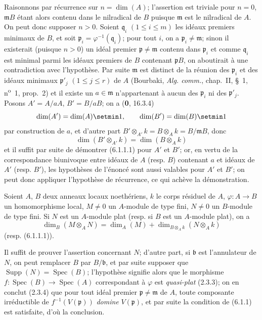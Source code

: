 Raisonnons par récurrence sur $n=\dim(A)$; l'assertion est triviale pour
$n=0$, $\mathfrak mB$ étant alors contenu dans le nilradical de $B$ puisque
$\mathfrak m$ est le nilradical de $A$. On peut donc supposer $n>0$. Soient
$\mathfrak q_i$ $(1\leq i\leq m)$ les idéaux premiers minimaux de $B$, et soit
$\mathfrak p_i=\varphi^{-1}(\mathfrak q_i)$; pour tout $i$, on a
$\mathfrak p_i\neq\mathfrak m$; sinon il existerait (puisque $n>0$) un idéal
premier $\mathfrak p\neq\mathfrak m$ contenu dans $\mathfrak p_i$ et comme
$\mathfrak q_i$ est minimal parmi les idéaux premiers de $B$ contenant
$\mathfrak pB$, on aboutirait à une contradiction avec l'hypothèse. Par suite
$\mathfrak m$ est distinct de la réunion des $\mathfrak p_i$ et des idéaux
minimaux $\mathfrak p'_j$ $(1\leq j\leq r)$ de $A$ (Bourbaki,
\emph{Alg. comm.}, chap.~II, §~1, n\textsuperscript{o}~1, prop.~2) et il
existe un $a\in\mathfrak m$ n'appartenant à aucun des $\mathfrak p_i$ ni des
$\mathfrak p'_j$. Posons $A'=A/aA$, $B'=B/aB$; on a (\textbf{0}, 16.3.4)
\[
\dim(A')=\dim(A)\setmin 1,\qquad \dim(B')=\dim(B)\setmin 1
\]
par construction de $a$, et d'autre part
$B'\otimes_{A'}k=B\otimes_Ak=B/\mathfrak mB$, donc
\[
\dim(B'\otimes_{A'}k)=\dim(B\otimes_Ak)
\]
et il suffit par suite de démontrer (6.1.1.1) pour $A'$ et $B'$; or, en vertu
de la correspondance biunivoque entre idéaux de $A$ (resp. $B$) contenant $a$
et idéaux de $A'$ (resp. $B'$), les hypothèses de l'énoncé sont aussi
valables pour $A'$ et $B'$; on peut donc appliquer l'hypothèse de récurrence,
ce qui achève la démonstration.

\begin{corollary}[6.1.2]
\label{IV.2.s6.1.2-fr}
Soient $A$, $B$ deux anneaux locaux noethériens, $k$ le corps résiduel de
$A$, $\varphi:A\to B$ un homomorphisme local, $M\neq0$ un $A$-module de type
fini, $N\neq0$ un $B$-module de type fini. Si $N$ est un $A$-module plat
\textup{(resp.} si $B$ est un $A$-module plat), on a
\begin{equation}
\dim_B(M\otimes_A N)=\dim_A(M)+
\dim_{B\otimes_Ak}(N\otimes_Ak)
\tag{6.1.2.1}\label{IV.2.s6.1.2.1-fr}
\end{equation}
\textup{(resp. (6.1.1.1))}.
\end{corollary}

Il suffit de prouver l'assertion concernant $N$; d'autre part, si
$\mathfrak b$ est l'annulateur de $N$, on peut remplacer $B$ par
$B/\mathfrak b$, et par suite supposer que
$\operatorname{Supp}(N)=\operatorname{Spec}(B)$; l'hypothèse signifie alors
que le morphisme $f:\operatorname{Spec}(B)\to\operatorname{Spec}(A)$
correspondant à $\varphi$ est \emph{quasi-plat} (2.3.3); on en conclut
(2.3.4) que pour tout idéal premier $\mathfrak p\neq\mathfrak m$ de $A$,
toute composante irréductible de $f^{-1}(V(\mathfrak p))$ \emph{domine}
$V(\mathfrak p)$, et par suite la condition de (6.1.1) est satisfaite, d'où la
conclusion.

